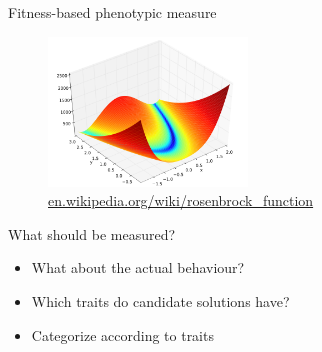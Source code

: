 \begin{frame}{Fitness-based phenotypic measure}
  \begin{figure}
    \centering
    \includegraphics[height=150px]{elias/images/elevation.png}
    \caption{\url{en.wikipedia.org/wiki/rosenbrock_function}}
  \end{figure}
\end{frame}

\begin{frame}{What should be measured?}
  \begin{itemize}
    \item What about the actual behaviour?
    \item Which traits do candidate solutions have?
    \item Categorize according to traits
  \end{itemize}
\end{frame}


